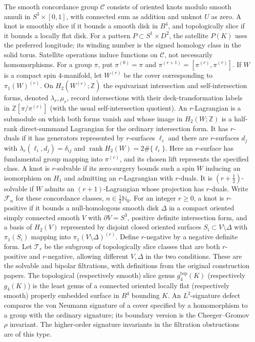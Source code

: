 \documentclass[11pt]{article}
\begin{document}
The smooth concordance group $\mathcal C$ consists of oriented knots modulo smooth annuli in $S^3\times[0,1]$, with connected sum as addition and unknot $U$ as zero. A knot is smoothly slice if it bounds a smooth disk in $B^4$, and topologically slice if it bounds a locally flat disk. For a pattern $P\subset S^1\times D^2$, the satellite $P(K)$ uses the preferred longitude; its winding number is the signed homology class in the solid torus. Satellite operations induce functions on $\mathcal C$, not necessarily homomorphisms. For a group $\pi$, put $\pi^{(0)}=\pi$ and $\pi^{(r+1)}=[\pi^{(r)},\pi^{(r)}]$. If $W$ is a compact spin $4$-manifold, let $W^{(r)}$ be the cover corresponding to $\pi_1(W)^{(r)}$. On $H_2(W^{(r)};\mathbb Z)$ the equivariant intersection and self-intersection forms, denoted $\lambda_r,\mu_r$, record intersections with their deck-transformation labels in $\mathbb Z[\pi/\pi^{(r)}]$ (with the usual self-intersection quotient). An $r$-Lagrangian is a submodule on which both forms vanish and whose image in $H_2(W;\mathbb Z)$ is a half-rank direct-summand Lagrangian for the ordinary intersection form. It has $r$-duals if it has generators represented by $r$-surfaces $\ell_i$ and there are $r$-surfaces $d_j$ with $\lambda_r(\ell_i,d_j)=\delta_{ij}$ and $\operatorname{rank}H_2(W)=2\#\{\ell_i\}$. Here an $r$-surface has fundamental group mapping into $\pi^{(r)}$, and its chosen lift represents the specified class. A knot is $r$-solvable if its zero-surgery bounds such a spin $W$ inducing an isomorphism on $H_1$ and admitting an $r$-Lagrangian with $r$-duals. It is $(r+\tfrac12)$-solvable if $W$ admits an $(r+1)$-Lagrangian whose projection has $r$-duals. Write $\mathcal F_n$ for these concordance classes, $n\in\tfrac12\mathbb N_0$. For an integer $r\geq0$, a knot is $r$-positive if it bounds a null-homologous smooth disk $\Delta$ in a compact oriented simply connected smooth $V$ with $\partial V=S^3$, positive definite intersection form, and a basis of $H_2(V)$ represented by disjoint closed oriented surfaces $S_i\subset V\setminus\Delta$ with $\pi_1(S_i)$ mapping into $\pi_1(V\setminus\Delta)^{(r)}$. Define $r$-negative by a negative definite form. Let $\mathcal T_r$ be the subgroup of topologically slice classes that are both $r$-positive and $r$-negative, allowing different $V,\Delta$ in the two conditions. These are the solvable and bipolar filtrations, with definitions from the original construction papers. The topological (respectively smooth) slice genus $g_4^{\mathrm{top}}(K)$ (respectively $g_4(K)$) is the least genus of a connected oriented locally flat (respectively smooth) properly embedded surface in $B^4$ bounding $K$. An $L^2$-signature defect compares the von Neumann signature of a cover specified by a homomorphism to a group with the ordinary signature; its boundary version is the Cheeger--Gromov $\rho$ invariant. The higher-order signature invariants in the filtration obstructions are of this type.
\end{document}
